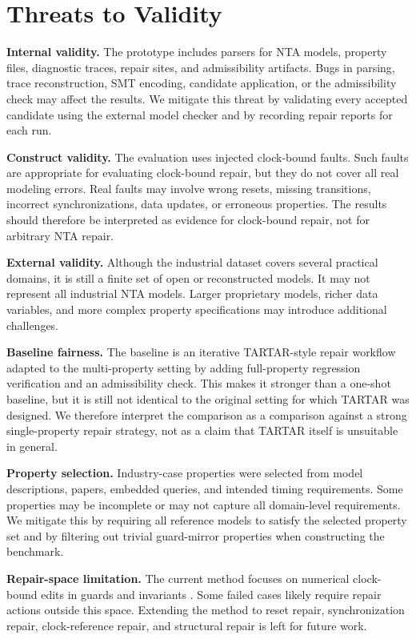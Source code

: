 \section{Threats to Validity}
\label{sec:threats}

\textbf{Internal validity.} The prototype includes parsers for
NTA models, property files, diagnostic traces, repair sites,
and admissibility artifacts. Bugs in parsing, trace reconstruction, SMT
encoding, candidate application, or the admissibility check may affect
the results. We mitigate this threat by validating every accepted
candidate using the external model checker and by recording repair
reports for each run.

\textbf{Construct validity.} The evaluation uses injected clock-bound
faults. Such faults are appropriate for evaluating clock-bound repair,
but they do not cover all real modeling errors. Real faults may involve
wrong resets, missing transitions, incorrect synchronizations, data
updates, or erroneous properties. The results should therefore be
interpreted as evidence for clock-bound repair, not for arbitrary NTA
repair.

\textbf{External validity.} Although the industrial dataset covers several
practical domains, it is still a finite set of open or reconstructed
models. It may not represent all industrial NTA models.
Larger proprietary models, richer data variables, and more complex
property specifications may introduce additional challenges.

\textbf{Baseline fairness.} The baseline is an iterative TARTAR-style
repair workflow adapted to the multi-property setting by adding
full-property regression verification and an admissibility check. This makes it
stronger than a one-shot baseline, but it is still not identical to the
original setting for which TARTAR was designed. We therefore interpret
the comparison as a comparison against a strong single-property repair
strategy, not as a claim that TARTAR itself is unsuitable in general.

\textbf{Property selection.} Industry-case properties were selected from
model descriptions, papers, embedded queries, and intended timing
requirements. Some properties may be incomplete or may not capture all
domain-level requirements. We mitigate this by requiring all reference
models to satisfy the selected property set and by filtering out trivial
guard-mirror properties when constructing the benchmark.

\textbf{Repair-space limitation.} The current method focuses on
numerical clock-bound edits in guards and invariants
\cite{kolbl2019clock}. Some failed cases likely require repair actions
outside this space. Extending the method to reset repair,
synchronization repair, clock-reference repair, and structural repair is
left for future work.
